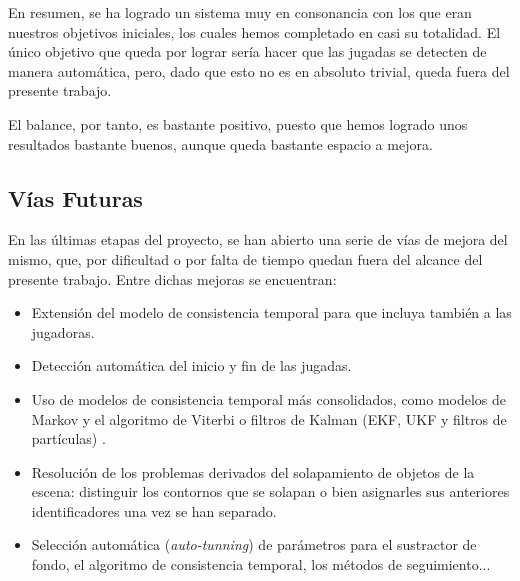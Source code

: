 En resumen, se ha logrado un sistema muy en consonancia con los que eran nuestros objetivos iniciales, los cuales hemos completado en casi su totalidad. El único objetivo que queda por lograr sería hacer que las jugadas se detecten de manera automática, pero, dado que esto no es en absoluto trivial, queda fuera del presente trabajo. 

El balance, por tanto, es bastante positivo, puesto que hemos logrado unos resultados bastante buenos, aunque queda bastante espacio a mejora.

\subsection{Vías Futuras}

En las últimas etapas del proyecto, se han abierto una serie de vías de mejora del mismo, que, por dificultad o por falta de tiempo quedan fuera del alcance del presente trabajo. Entre dichas mejoras se encuentran:
\begin{itemize}
    \item Extensión del modelo de consistencia temporal para que incluya también a las jugadoras.
    \item Detección automática del inicio y fin de las jugadas. 
    \item Uso de modelos de consistencia temporal más consolidados, como modelos de Markov y el algoritmo de Viterbi\cite{Bishop:2006:PRM:1162264} o filtros de Kalman (EKF, UKF y filtros de partículas) \cite{Thrun:2005:PR:1121596}.
    \item Resolución de los problemas derivados del solapamiento de objetos de la escena: distinguir los contornos que se solapan o bien asignarles sus anteriores identificadores una vez se han separado.
    \item Selección automática (\textit{auto-tunning}) de parámetros para el sustractor de fondo, el algoritmo de consistencia temporal, los métodos de seguimiento...
\end{itemize}